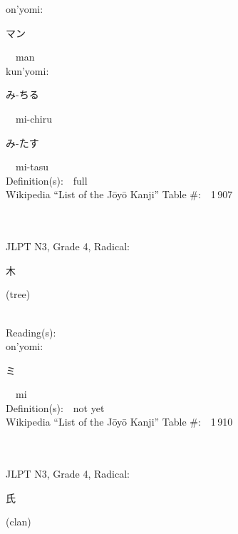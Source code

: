 \begin{multicols}{2}
{\hspace*{1em}}on'yomi:\ \ \\
{\hspace*{2em}}{\begin{CJK}{UTF8}{min} マン \end{CJK}}\ \ man\ \ \\
{\hspace*{1em}}kun'yomi:\ \ \\
{\hspace*{2em}}{\begin{CJK}{UTF8}{min} み-ちる \end{CJK}}\ \ mi-chiru\ \ \\
{\hspace*{2em}}{\begin{CJK}{UTF8}{min} み-たす \end{CJK}}\ \ mi-tasu\ \ \\
Definition(s):\ \ full \\
Wikipedia ``List of the J\=oy\=o Kanji'' Table \#:\ \ 1\,907 \\
\ \ \\
{\fontsize{34pt}{40pt}  }\ \ \\  %
{JLPT N3, Grade 4, Radical:\ \ {\begin{CJK}{UTF8}{min} 木 \end{CJK}} (tree) } \\
Reading(s):\ \ \\
{\hspace*{1em}}on'yomi:\ \ \\
{\hspace*{2em}}{\begin{CJK}{UTF8}{min} ミ \end{CJK}}\ \ mi\ \ \\
Definition(s):\ \ not yet \\
Wikipedia ``List of the J\=oy\=o Kanji'' Table \#:\ \ 1\,910 \\
\ \ \\
{\fontsize{34pt}{40pt}  }\ \ \\  %
{JLPT N3, Grade 4, Radical:\ \ {\begin{CJK}{UTF8}{min} 氏 \end{CJK}} (clan) } \\

\end{multicols}
